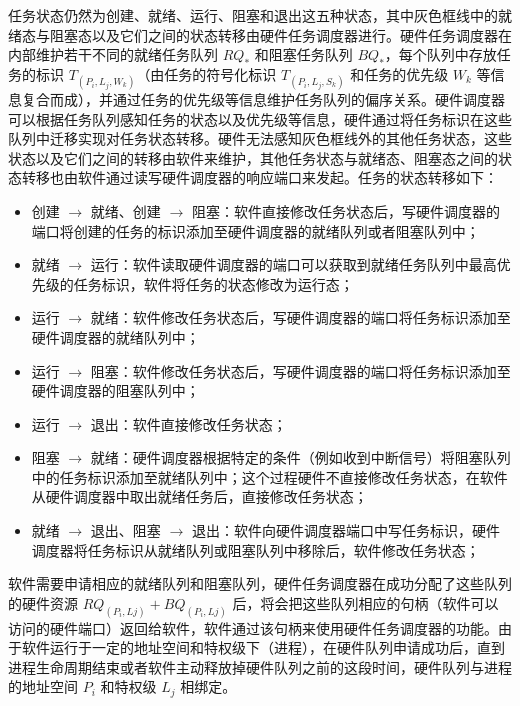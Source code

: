 任务状态仍然为创建、就绪、运行、阻塞和退出这五种状态，其中灰色框线中的就绪态与阻塞态以及它们之间的状态转移由硬件任务调度器进行。硬件任务调度器在内部维护若干不同的就绪任务队列 $RQ_{*}$ 和阻塞任务队列 $BQ_{*}$，每个队列中存放任务的标识 $T_{(P_{i}, L_{j}, W_{k})}$（由任务的符号化标识 $T_{(P_{i}, L_{j}, S_{k})}$ 和任务的优先级 $W_{k}$ 等信息复合而成），并通过任务的优先级等信息维护任务队列的偏序关系。硬件调度器可以根据任务队列感知任务的状态以及优先级等信息，硬件通过将任务标识在这些队列中迁移实现对任务状态转移。硬件无法感知灰色框线外的其他任务状态，这些状态以及它们之间的转移由软件来维护，其他任务状态与就绪态、阻塞态之间的状态转移也由软件通过读写硬件调度器的响应端口来发起。任务的状态转移如下：

\begin{itemize}
    \item 创建 $\longrightarrow$ 就绪、创建 $\longrightarrow$ 阻塞：软件直接修改任务状态后，写硬件调度器的端口将创建的任务的标识添加至硬件调度器的就绪队列或者阻塞队列中；
    
    \item 就绪 $\longrightarrow$ 运行：软件读取硬件调度器的端口可以获取到就绪任务队列中最高优先级的任务标识，软件将任务的状态修改为运行态；
    
    \item 运行 $\longrightarrow$ 就绪：软件修改任务状态后，写硬件调度器的端口将任务标识添加至硬件调度器的就绪队列中；
    
    \item 运行 $\longrightarrow$ 阻塞：软件修改任务状态后，写硬件调度器的端口将任务标识添加至硬件调度器的阻塞队列中；
    
    \item 运行 $\longrightarrow$ 退出：软件直接修改任务状态；
    
    \item 阻塞 $\longrightarrow$ 就绪：硬件调度器根据特定的条件（例如收到中断信号）将阻塞队列中的任务标识添加至就绪队列中；这个过程硬件不直接修改任务状态，在软件从硬件调度器中取出就绪任务后，直接修改任务状态；
    
    \item 就绪 $\longrightarrow$ 退出、阻塞 $\longrightarrow$ 退出：软件向硬件调度器端口中写任务标识，硬件调度器将任务标识从就绪队列或阻塞队列中移除后，软件修改任务状态；
\end{itemize}

软件需要申请相应的就绪队列和阻塞队列，硬件任务调度器在成功分配了这些队列的硬件资源 $RQ_{(P_{i}, L{j})} + BQ_{(P_{i}, L{j})}$ 后，将会把这些队列相应的句柄（软件可以访问的硬件端口）返回给软件，软件通过该句柄来使用硬件任务调度器的功能。由于软件运行于一定的地址空间和特权级下（进程），在硬件队列申请成功后，直到进程生命周期结束或者软件主动释放掉硬件队列之前的这段时间，硬件队列与进程的地址空间 $P_{i}$ 和特权级 $L_{j}$ 相绑定。

